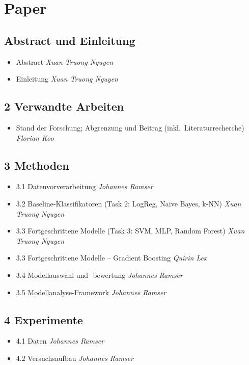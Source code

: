 \documentclass[11pt]{scrartcl}
\newcommand{\by}[1]{\hfill\textit{#1}}
\begin{document}
\section{Paper}

\subsection*{Abstract und Einleitung}
\begin{itemize}
	\item Abstract \by{Xuan Truong Nguyen}
	\item Einleitung \by{Xuan Truong Nguyen}
\end{itemize}

\subsection*{2 Verwandte Arbeiten}
\begin{itemize}
	\item Stand der Forschung; Abgrenzung und Beitrag (inkl.\ Literaturrecherche) \by{Florian Koo}
\end{itemize}

\subsection*{3 Methoden}
\begin{itemize}
	\item 3.1 Datenvorverarbeitung \by{Johannes Ramser}
	\item 3.2 Baseline-Klassifikatoren (Task 2: LogReg, Naive Bayes, k-NN) \by{Xuan Truong Nguyen}
	\item 3.3 Fortgeschrittene Modelle (Task 3: SVM, MLP, Random Forest) \by{Xuan Truong Nguyen}
	\item 3.3 Fortgeschrittene Modelle -- Gradient Boosting \by{Quirin Lex}
	\item 3.4 Modellauswahl und -bewertung \by{Johannes Ramser}
	\item 3.5 Modellanalyse-Framework \by{Johannes Ramser}
\end{itemize}

\subsection*{4 Experimente}
\begin{itemize}
	\item 4.1 Daten \by{Johannes Ramser}
	\item 4.2 Versuchsaufbau \by{Johannes Ramser}
\end{itemize}
\end{document}

